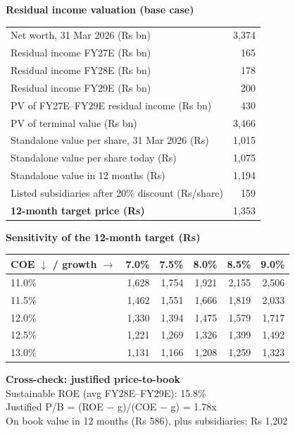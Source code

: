 \documentclass[10pt,a4paper]{article}
\begin{document}
\begin{minipage}[t]{0.48\linewidth}\vspace{0pt}\footnotesize
\textbf{Residual income valuation (base case)}\\[2pt]
\begin{tabular}{lr}
\toprule
Net worth, 31 Mar 2026 (Rs bn) & 3,374 \\
Residual income FY27E (Rs bn) & 165 \\
Residual income FY28E (Rs bn) & 178 \\
Residual income FY29E (Rs bn) & 200 \\
PV of FY27E--FY29E residual income (Rs bn) & 430 \\
PV of terminal value (Rs bn) & 3,466 \\
Standalone value per share, 31 Mar 2026 (Rs) & 1,015 \\
Standalone value per share today (Rs) & 1,075 \\
Standalone value in 12 months (Rs) & 1,194 \\
Listed subsidiaries after 20\% discount (Rs/share) & 159 \\
\textbf{12-month target price (Rs)} & 1,353 \\
\bottomrule
\end{tabular}
\end{minipage}\hfill
\begin{minipage}[t]{0.48\linewidth}\vspace{0pt}\footnotesize
\textbf{Sensitivity of the 12-month target (Rs)}\\[2pt]
{\setlength{\tabcolsep}{4pt}\begin{tabular}{lrrrrr}
\toprule
COE $\downarrow$ / growth $\rightarrow$ & 7.0\% & 7.5\% & 8.0\% & 8.5\% & 9.0\% \\
\midrule
11.0\% & 1,628 & 1,754 & 1,921 & 2,155 & 2,506 \\
11.5\% & 1,462 & 1,551 & 1,666 & 1,819 & 2,033 \\
12.0\% & 1,330 & 1,394 & 1,475 & 1,579 & 1,717 \\
12.5\% & 1,221 & 1,269 & 1,326 & 1,399 & 1,492 \\
13.0\% & 1,131 & 1,166 & 1,208 & 1,259 & 1,323 \\
\bottomrule
\end{tabular}}

\medskip
\textbf{Cross-check: justified price-to-book}\\
Sustainable ROE (avg FY28E--FY29E): 15.8\%\\
Justified P/B = (ROE $-$ g)/(COE $-$ g) = 1.78x\\
On book value in 12 months (Rs 586), plus subsidiaries: Rs 1,202
\end{minipage}
\end{document}
